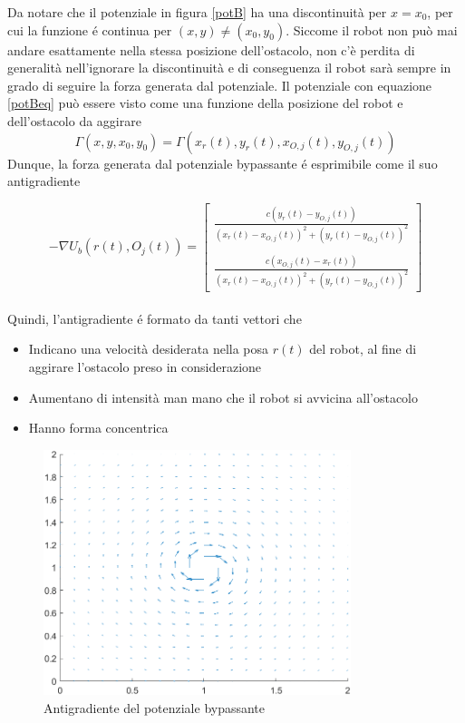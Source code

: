 \documentclass[14pt,a4paper]{extarticle}
\begin{document}
Da notare che il potenziale in figura \ref{potB} ha una discontinuità per \(x=x_0\), per cui la funzione é continua per \((x,y) \neq (x_0,y_0)\). Siccome il robot non può mai andare esattamente nella stessa posizione dell'ostacolo, non c'è perdita di generalità nell'ignorare la discontinuità e di conseguenza il robot sarà sempre in grado di seguire la forza generata dal potenziale. Il potenziale con equazione \ref{potBeq} può essere visto come una funzione della posizione del robot e dell'ostacolo da aggirare \[\Gamma(x,y,x_0,y_0) = \Gamma(x_r(t),y_r(t),x_{O,j}(t),y_{O,j}(t))\] Dunque, la forza generata dal potenziale bypassante é esprimibile come il suo antigradiente

\begin{equation}
-\nabla U_b(r(t),O_j(t)) =
\begin{bmatrix}
\frac{c(y_r(t)-y_{O,j}(t))}{(x_r(t)-x_{O,j}(t))^2 + (y_r(t)-y_{O,j}(t))^2} \\\\
\frac{c(x_{O,j}(t) - x_r(t))}{(x_r(t)-x_{O,j}(t))^2 + (y_r(t)-y_{O,j}(t))^2}
\end{bmatrix}
\end{equation}\\

Quindi, l'antigradiente é formato da tanti vettori che
\begin{itemize}
\item Indicano una velocità desiderata nella posa \(r(t)\) del robot, al fine di aggirare l'ostacolo preso in considerazione  \item Aumentano di intensità man mano che il robot si avvicina all'ostacolo
\item Hanno forma concentrica
\end{itemize}

\begin{figure}[H]
\centering
\caption{Antigradiente del potenziale bypassante}
\label{antigradB}
\includegraphics[width=0.8\textwidth]{antigradB.png}
\end{figure}
\end{document}
